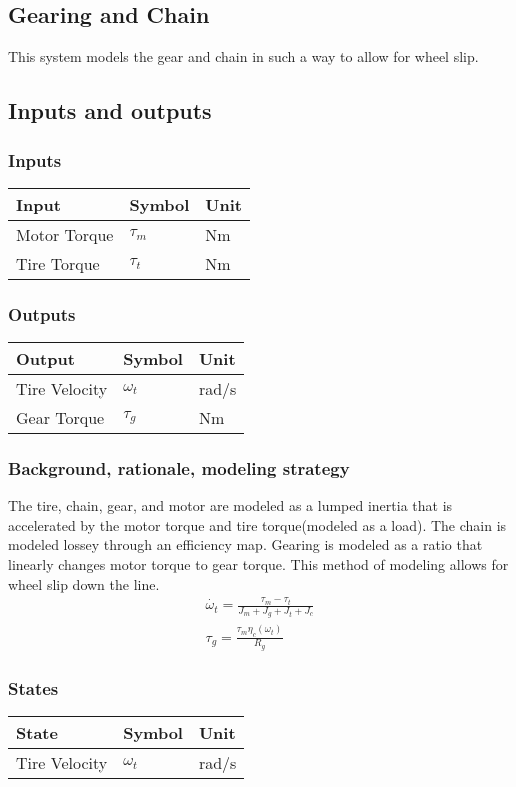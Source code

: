 \documentclass[../SimBALink.tex]{subfiles}
\begin{document}
\subsection{Gearing and Chain} This system models the gear and chain in such a way to allow for wheel slip. 

\subsection{Inputs and outputs}
	\subsubsection{Inputs}
	\begin{tabular}{ l | l | l  }
		Input					&	Symbol		&	Unit		\\	\hline
		Motor Torque			& 	$\tau_m$ 		& Nm \\
		Tire Torque				&	$\tau_t$	&	Nm
	\end{tabular}
	
	\subsubsection{Outputs}
	\begin{tabular}{ l | l | l  }
		Output					&	Symbol		&	Unit		\\	\hline
		Tire Velocity		&	$\omega_t$		&	rad/s \\
		Gear Torque			&	$\tau_g$		& Nm
	\end{tabular}

\subsubsection{Background, rationale, modeling strategy}
The tire, chain, gear, and motor are modeled as a lumped inertia that is accelerated by the motor torque and tire torque(modeled as a load). The chain is modeled lossey through an efficiency map. Gearing is modeled as a ratio that linearly changes motor torque to gear torque. This method of modeling allows for wheel slip down the line.
		\begin{gather}
		\dot{\omega_t} = \frac{\tau_m - \tau_t}{J_m + J_g + J_t + J_c} \\
		\tau_g = \frac{\tau_m \eta_c (\omega_t)}{R_g}
		\end{gather}

\subsubsection{States}
	\begin{tabular}{ l | l | l  }
		State					&	Symbol		&	Unit		\\	\hline
		Tire Velocity 			&	$\omega_t$	&	rad/s
	\end{tabular}
\end{document}
